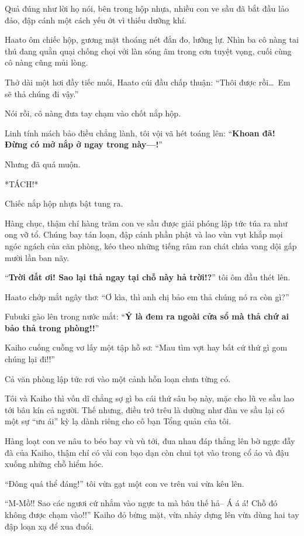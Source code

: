 \documentclass[../main.tex]{subfiles}
\begin{document}
Quả đúng như lời họ nói, bên trong hộp nhựa, nhiều con ve sầu đã bắt đầu lảo đảo, đập cánh một cách yếu ớt vì thiếu dưỡng khí.

Haato ôm chiếc hộp, gương mặt thoáng nét đắn đo, lưỡng lự. Nhìn ba cô nàng tai thú đang quằn quại chống chọi với làn sóng âm trong cơn tuyệt vọng, cuối cùng cô nàng cũng mủi lòng.

Thở dài một hơi đầy tiếc nuối, Haato cúi đầu chấp thuận: ``Thôi được rồi\dots\ Em sẽ thả chúng đi vậy.''

Nói rồi, cô nàng đưa tay chạm vào chốt nắp hộp.

Linh tính mách bảo điều chẳng lành, tôi vội vã hét toáng lên: ``\textbf{Khoan đã! Đừng có mở nắp ở ngay trong này—!}''

Nhưng đã quá muộn.

*TÁCH!*

Chiếc nắp hộp nhựa bật tung ra.

Hàng chục, thậm chí hàng trăm con ve sầu được giải phóng lập tức túa ra như ong vỡ tổ. Chúng bay tán loạn, đập cánh phần phật và lao vùn vụt khắp mọi ngóc ngách của căn phòng, kéo theo những tiếng râm ran chát chúa vang dội gấp mười lần ban nãy.

``\textbf{Trời đất ơi! Sao lại thả ngay tại chỗ này hả trời!?}'' tôi ôm đầu thét lên.

Haato chớp mắt ngây thơ: ``Ơ kìa, thì anh chị bảo em thả chúng nó ra còn gì?''

Fubuki gào lên trong nước mắt: ``\textbf{Ý là đem ra ngoài cửa sổ mà thả chứ ai bảo thả trong phòng!!}''

Kaiho cuống cuồng vơ lấy một tập hồ sơ: ``Mau tìm vợt hay bất cứ thứ gì gom chúng lại đi!!''

Cả văn phòng lập tức rơi vào một cảnh hỗn loạn chưa từng có.

Tôi và Kaiho thì vốn dĩ chẳng sợ gì ba cái thứ sâu bọ này, mặc cho lũ ve sầu lao tới bâu kín cả người. Thế nhưng, điều trớ trêu là dường như đàn ve sầu lại có một sự ``ưu ái'' kỳ lạ dành riêng cho cô bạn Tổng quản của tôi.

Hàng loạt con ve nâu to béo bay vù vù tới, đua nhau đáp thẳng lên bờ ngực đẫy đà của Kaiho, thậm chí có vài con bạo dạn còn chui tọt vào trong cổ áo và đậu xuống những chỗ hiểm hóc.

``Đông quá thể đáng!'' tôi vừa gạt một con ve trên vai vừa kêu lên.

``M-Mồ!! Sao các ngươi cứ nhắm vào ngực ta mà bâu thế hả-- Á á á! Chỗ đó không được chạm vào!!'' Kaiho đỏ bừng mặt, vừa nhảy dựng lên vừa dùng hai tay đập loạn xạ để xua đuổi.
\end{document}

